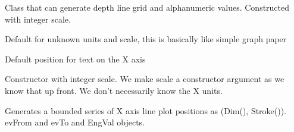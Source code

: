 \documentclass[letterpaper,10pt,english]{sphinxmanual}
\begin{document}
\begin{fulllineitems}
\label{\detokenize{ref/util/plot/XGrid:TotalDepth.util.plot.XGrid.XGrid}}
Class that can generate depth line grid and alphanumeric values.
Constructed with integer scale.

\begin{fulllineitems}
\label{\detokenize{ref/util/plot/XGrid:TotalDepth.util.plot.XGrid.XGrid.DEFAULT_INTERVAL_MAP}}
Default for unknown units and scale, this is basically like
simple graph paper

\end{fulllineitems}


\begin{fulllineitems}
\label{\detokenize{ref/util/plot/XGrid:TotalDepth.util.plot.XGrid.XGrid.DEFAULT_INTERVAL_TEXT}}
Default position for text on the X axis

\end{fulllineitems}


\begin{fulllineitems}
\label{\detokenize{ref/util/plot/XGrid:TotalDepth.util.plot.XGrid.XGrid.__init__}}
Constructor with integer scale. We make scale a constructor argument
as we know that up front. We don’t necessarily know the X units.

\end{fulllineitems}


\begin{fulllineitems}
\label{\detokenize{ref/util/plot/XGrid:TotalDepth.util.plot.XGrid.XGrid.genXAxisRange}}
Generates a bounded series of X axis line plot positions as
(Dim(), Stroke()). evFrom and evTo and EngVal objects.


\end{fulllineitems}
\end{fulllineitems}
\end{document}
